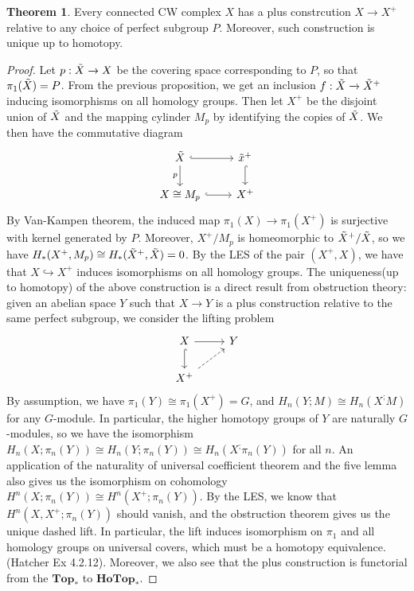 \documentclass{article}
\theoremstyle{definition}
\newtheorem{theorem}{Theorem}[section]
\theoremstyle{definition}
\theoremstyle{definition}
\theoremstyle{definition}
\theoremstyle{definition}
\theoremstyle{definition}
\theoremstyle{definition}
\begin{document}
\begin{tcolorbox}[colback=red!5!white,colframe=red!30!white]
\begin{theorem}
    Every connected CW complex $X$ has a plus constrcution $X\xrightarrow{}X^+$ relative to any choice of perfect subgroup $P$. Moreover, such construction is unique up to homotopy.
\end{theorem}
\end{tcolorbox}
\begin{proof}
Let $p:\Tilde{X}\xrightarrow{}X$ be the covering space corresponding to $P$, so that $\pi_1(\Tilde{X})=P$. From the previous proposition, we get an inclusion $f:\Tilde{X}\xrightarrow{}\Tilde{X}^+$ inducing isomorphisms on all homology groups. Then let $X^+$ be the disjoint union of $\Tilde{X}$ and the mapping cylinder $M_p$ by identifying the copies of $\Tilde{X}$. We then have the commutative diagram
\[
\begin{tikzcd}
\Tilde{X}\arrow[r,hookrightarrow]\arrow[d,swap,"p"]&\Tilde{x}^+\arrow[d,hookrightarrow]\\
X\cong M_p\arrow[r,hookrightarrow]&X^+
\end{tikzcd}
\]
By Van-Kampen theorem, the induced map $\pi_1(X)\xrightarrow{}\pi_1(X^+)$ is surjective with kernel generated by $P$. Moreover, $X^+/M_p$ is homeomorphic to $\Tilde{X}^+/\Tilde{X}$, so we have $H_*(X^+,M_p)\cong H_*(\Tilde{X}^+,\Tilde{X})=0$. By the LES of the pair $(X^+,X)$, we have that $X\hookrightarrow X^+$ induces isomorphisms on all homology groups. The uniqueness(up to homotopy) of the above construction is a direct result from obstruction theory: given an abelian space $Y$ such that $X\xrightarrow{} Y$ is a plus construction relative to the same perfect subgroup, we consider the lifting problem
\[
\begin{tikzcd}
X\arrow[d,hookrightarrow]\arrow[r]&Y\\
X^+\arrow[ur,dashrightarrow]
\end{tikzcd}
\]
By assumption, we have $\pi_1(Y)\cong \pi_1(X^+)=G$, and $H_n(Y;M)\cong H_n(X^;M)$ for any $G$-module. In particular, the higher homotopy groups of $Y$ are naturally $G$-modules, so we have the isomorphism $H_n(X;\pi_n(Y))\cong H_n(Y;\pi_n(Y))\cong H_n(X^;\pi_n(Y))$ for all $n$. An application of the naturality of universal coefficient theorem and the five lemma also gives us the isomorphism on cohomology $H^n(X;\pi_n(Y))\cong H^n(X^+;\pi_n(Y))$. By the LES, we know that $H^n(X,X^+;\pi_n(Y))$ should vanish, and the obstruction theorem gives us the unique dashed lift. In particular, the lift induces isomorphism on $\pi_1$ and all homology groups on universal covers, which must be a homotopy equivalence.(Hatcher Ex 4.2.12). Moreover, we also see that the plus construction is functorial from the $\textbf{Top}_*$ to $\textbf{HoTop}_*$.
\end{proof}
\end{document}
